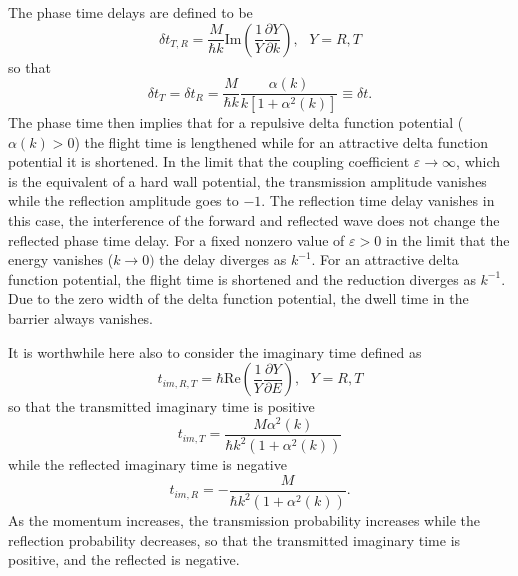 \documentclass[preprint,aps]{revtex4}
\begin{document}
The phase time delays are defined to be
\begin{equation}
\delta t_{T,R}=\frac{M}{\hbar k}\mathrm{Im}\left( \frac{1}{Y}\frac{\partial Y%
}{\partial k}\right) ,\text{ \ \ }Y=R,T  \label{3.7}
\end{equation}%
so that
\begin{equation}
\delta t_{T}=\delta t_{R}=\frac{M}{\hbar k}\frac{\alpha \left( k\right) }{k%
\left[ 1+\alpha ^{2}\left( k\right) \right] }\equiv \delta t.  \label{3.8}
\end{equation}%
The phase time then implies that for a repulsive delta function potential ($%
\alpha \left( k\right) >0$) the flight time is lengthened while for an
attractive delta function potential it is shortened. In the limit that the
coupling coefficient $\varepsilon \rightarrow \infty $, which is the
equivalent of a hard wall potential, the transmission amplitude vanishes
while the reflection amplitude goes to $-1$. The reflection time delay
vanishes in this case, the interference of the forward and reflected wave
does not change the reflected phase time delay. For a fixed nonzero value
of $\varepsilon >0$ in the limit that the energy vanishes ($k\rightarrow 0)$
the delay diverges as $k^{-1}$. For an attractive delta function potential,
the flight time is shortened and the reduction diverges as $k^{-1}$. Due to
the zero width of the delta function potential, the dwell time \cite{Mugabook} in the
barrier always vanishes.

It is worthwhile here also to consider the imaginary time defined as \cite{Pollak1984}
\begin{equation}
t_{im,R,T}=\hbar \text{Re}\left( \frac{1}{Y}\frac{\partial Y}{\partial E}%
\right) ,\text{ \ \ }Y=R,T  \label{3.9}
\end{equation}%
so that the transmitted imaginary time is positive%
\begin{equation}
t_{im,T}=\frac{M\alpha ^{2}\left( k\right) }{\hbar k^{2}\left( 1+\alpha
^{2}\left( k\right) \right) }  \label{3.10}
\end{equation}%
while the reflected imaginary time is negative%
\begin{equation}
t_{im,R}=-\frac{M}{\hbar k^{2}\left( 1+\alpha ^{2}\left( k\right) \right) }.
\label{3.11}
\end{equation}%
As the momentum increases, the transmission probability increases while the
reflection probability decreases, so that the transmitted imaginary time is
positive, and the reflected is negative.
\end{document}
